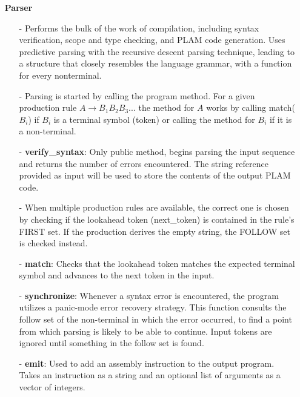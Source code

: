 \documentclass{article}
\begin{document}
\begin{itemize}
        \item[]\textbf{Parser}
            \begin{itemize}
                \item[-] Performs the bulk of the work of compilation, including syntax verification, scope and type checking, and PLAM code generation. Uses predictive parsing with the recursive descent parsing technique, leading to a structure that closely resembles the language grammar, with a function for every nonterminal.
                \item[-] Parsing is started by calling the program method. For a given production rule $A \longrightarrow B_1B_2B_3...$ the method for $A$ works by calling match($B_i$) if $B_i$ is a terminal symbol (token) or calling the method for $B_i$ if it is a non-terminal.  
                \item[-] \textbf{verify\_syntax}: Only public method, begins parsing the input sequence and returns the number of errors encountered. The string reference provided as input will be used to store the contents of the output PLAM code. 
                \item[-] When multiple production rules are available, the correct one is chosen by checking if the lookahead token (next\_token) is contained in the rule's FIRST set. If the production derives the empty string, the FOLLOW set is checked instead.
                \item[-] \textbf{match}: Checks that the lookahead token matches the expected terminal symbol and advances to the next token in the input.
                \item[-] \textbf{synchronize}: Whenever a syntax error is encountered, the program utilizes a panic-mode error recovery strategy. This function consults the follow set of the non-terminal in which the error occurred, to find a point from which parsing is likely to be able to continue. Input tokens are ignored until something in the follow set is found.                 
                \item[-] \textbf{emit}: Used to add an assembly instruction to the output program. Takes an instruction as a string and an optional list of arguments as a vector of integers. 
            \end{itemize}


\end{itemize}
\end{document}

